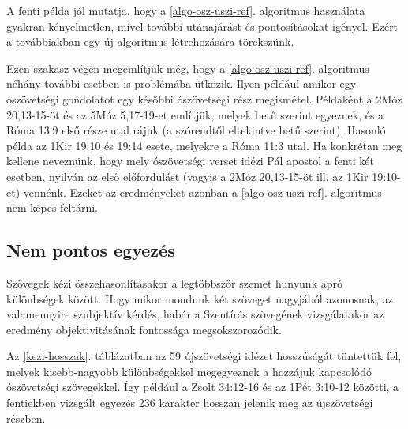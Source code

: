 \documentclass{article}
\begin{document}
A fenti példa jól mutatja, hogy a \ref{algo-osz-uszi-ref}. algoritmus használata gyakran
kényelmetlen, mivel további utánajárást és pontosításokat igényel. Ezért a továbbiakban
egy új algoritmus létrehozására törekszünk.

Ezen szakasz végén megemlítjük még, hogy a \ref{algo-osz-uszi-ref}. algoritmus néhány további
esetben is problémába ütközik. Ilyen például amikor egy ószövetségi gondolatot egy későbbi
ószövetségi rész megismétel. Példaként a 2Móz 20,13-15-öt és az 5Móz 5,17-19-et említjük,
melyek betű szerint egyeznek, és a Róma 13:9 első része utal rájuk (a szórendtől eltekintve
betű szerint). Hasonló példa az 1Kir 19:10 és 19:14 esete, melyekre a Róma 11:3 utal.
Ha konkrétan meg kellene neveznünk, hogy mely ószövetségi verset idézi Pál apostol a fenti
két esetben, nyilván az első előfordulást (vagyis a 2Móz 20,13-15-öt ill. az 1Kir 19:10-et)
vennénk. Ezeket az eredményeket azonban a \ref{algo-osz-uszi-ref}. algoritmus nem képes feltárni.

\subsection{Nem pontos egyezés}

Szövegek kézi összehasonlításakor a legtöbbször szemet hunyunk apró különbségek
között. Hogy mikor mondunk két szöveget nagyjából azonosnak, az valamennyire
szubjektív kérdés, habár a Szentírás szövegének vizsgálatakor
az eredmény objektivitásának fontossága megsokszorozódik.

Az \ref{kezi-hosszak}. táblázatban az 59 újszövetségi idézet hosszúságát tüntettük fel,
melyek kisebb-nagyobb különbségekkel megegyeznek a hozzájuk kapcsolódó ószövetségi
szövegekkel. Így például a Zsolt 34:12-16 és az 1Pét 3:10-12 közötti, a fentiekben
vizsgált egyezés 236 karakter hosszan jelenik meg az újszövetségi részben.
\end{document}
